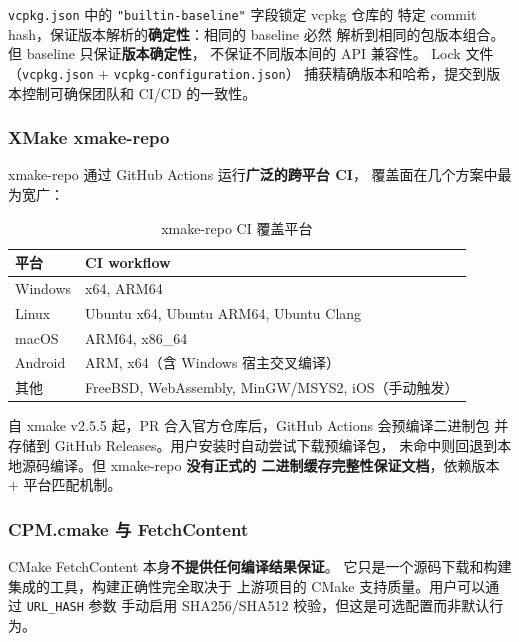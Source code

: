\documentclass[12pt,a4paper,fontset=fandol]{ctexbook}
\begin{document}
\begin{note}[ title={Vcpkg baseline 保证}]
\texttt{vcpkg.json} 中的 \texttt{"builtin-baseline"} 字段锁定 vcpkg 仓库的
特定 commit hash，保证版本解析的\textbf{确定性}：相同的 baseline 必然
解析到相同的包版本组合。但 baseline 只保证\textbf{版本确定性}，
不保证不同版本间的 API 兼容性。
Lock 文件（\texttt{vcpkg.json} + \texttt{vcpkg-configuration.json}）
捕获精确版本和哈希，提交到版本控制可确保团队和 CI/CD 的一致性。
\end{note}

\subsubsection*{XMake xmake-repo}

xmake-repo 通过 GitHub Actions 运行\textbf{广泛的跨平台 CI}，
覆盖面在几个方案中最为宽广：

\begin{table}[H]
\centering
\caption{xmake-repo CI 覆盖平台}
\label{tab:xmake-ci}
\small
\begin{tabularx}{\textwidth}{l X}
\toprule
\textbf{平台} & \textbf{CI workflow} \\
\midrule
Windows  & x64, ARM64 \\
Linux    & Ubuntu x64, Ubuntu ARM64, Ubuntu Clang \\
macOS    & ARM64, x86\_64 \\
Android  & ARM, x64（含 Windows 宿主交叉编译） \\
其他     & FreeBSD, WebAssembly, MinGW/MSYS2, iOS（手动触发） \\
\bottomrule
\end{tabularx}
\end{table}

自 xmake v2.5.5 起，PR 合入官方仓库后，GitHub Actions 会预编译二进制包
并存储到 GitHub Releases。用户安装时自动尝试下载预编译包，
未命中则回退到本地源码编译。但 xmake-repo \textbf{没有正式的
二进制缓存完整性保证文档}，依赖版本 + 平台匹配机制。

\subsubsection*{CPM.cmake 与 FetchContent}

CMake FetchContent 本身\textbf{不提供任何编译结果保证}。
它只是一个源码下载和构建集成的工具，构建正确性完全取决于
上游项目的 CMake 支持质量。用户可以通过 \texttt{URL\_HASH} 参数
手动启用 SHA256/SHA512 校验，但这是可选配置而非默认行为。
\end{document}
